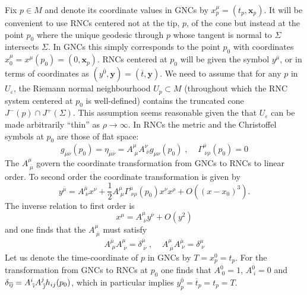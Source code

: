 \documentclass[12pt]{article}
\newcommand{\be}{\begin{equation}}
\newcommand{\ee}{\end{equation}}
\newcommand{\mb}[1]{\marginnote{\texttt{\small MB:\,#1}}}
\newcommand{\ibar}{{\overline{\emph\i}}}
\newcommand{\jbar}{{\overline{\emph\j}}}
\begin{document}
Fix $p\in M$ and denote its coordinate values in GNCs by $x^\mu_p= (t_p,\mathbf x_p)$. It will be convenient to use RNCs centered not at the tip, $p$, of the cone but instead at the point $p_0$ where the unique geodesic through $p$ whose tangent is normal to $\Sigma$ intersects $\Sigma$. In GNCs this simply corresponds to the point $p_0$ with coordinates $x_0^\mu=x^\mu (p_0)= (0,\mathbf x_p)$. RNCs centered at $p_0$ will be given the symbol $y^{\overline{\mu}}$, or in terms of coordinates as $(y^{\overline{0}},\mathbf{y})=(\overline{t},\mathbf{y})$.
We need to assume that for any $p$ in $U_\varepsilon$, the Riemann normal neighbourhood $U_p\subset M$ (throughout which the RNC system centered at $p_0$ is well-defined) contains the truncated cone $J^- (p)\cap J^+ (\Sigma)$. This assumption seems reasonable given the that $U_\varepsilon$ can be made arbitrarily ``thin'' as $\rho\rightarrow\infty$. In RNCs the metric and the Christoffel symbols at $p_0$ are those of flat space:
\be\label{eq:RNCMetricTransAtPAndChris}
g_{\overline{\mu} \overline{\nu}} (p_0)=\eta_{\overline{\mu} \overline{\nu}}=A^{\mu}_{\;\overline{\mu}}A^{\nu}_{\;\overline{\nu}}g_{\mu\nu} (p_0)\;,\;\;\;\;\Gamma^{\overline{\mu}}_{\;\overline{\nu}\overline{\rho}} (p_0)=0
\ee
The $A^{\mu}_{\;\overline{\mu}}$ govern the coordinate transformation from GNCs to RNCs to linear order. %
To second order the coordinate transformation is given by
\be\label{eq:RNCtotaltrans}
y^{\overline{\mu}}=A^{\overline{\mu}}_{\;\nu}x^\nu+\frac{1}{2}A^{\overline{\mu}}_{\;\mu}\Gamma^{\mu}_{\;\nu\rho} (p_0)x^\nu x^\rho+O ( (x-x_0)^3).
\ee
The inverse relation to first order is 
\be\label{eq:RNCinversetrans}
x^{\mu}=A^{\mu}_{\;\overline{\nu}}y^{\overline{\nu}}+O (y^2)
\ee
and one finds that the $A^{\mu}_{\;\overline{\mu}}$ must satisfy
\be\label{eq:RNCeqnforA}
A^{\overline{\mu}}_{\;\mu}A^{\mu}_{\;\overline{\nu}}=\delta^{\overline{\mu}}_{\;\overline{\nu}}\;,\;\;\;\;A^{\mu}_{\;\overline{\mu}}A^{\overline{\mu}}_{\;\nu}=\delta^{\mu}_{\;\nu}
\ee
Let us denote the time-coordinate of $p$ in GNCs by $T=x^0_p=t_p$. For the transformation from GNCs to RNCs at $p_0$ one finds that $A^{\overline 0}_{\;0}=1$, $A^{\overline 0}_{\;i}=0$ and $\delta_{\ibar\jbar}=A^i_{\;\ibar}A^j_{\;\jbar}h_{ij} (p_0)$, which in particular implies $y^{\overline{0}}_p=\overline{t}_p=t_p=T$.
\end{document}
